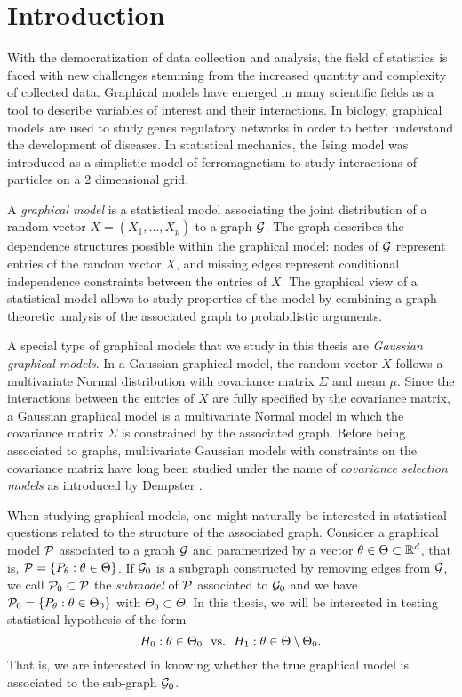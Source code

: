 \section{Introduction}

With the democratization of data collection and analysis, the field of statistics is faced with new challenges stemming from the increased quantity and complexity of collected data. Graphical models have emerged in many scientific fields as a tool to describe variables of interest and their interactions. In biology, graphical models are used to study genes regulatory networks in order to better understand the development of diseases. In statistical mechanics, the Ising model \cite{ising1925beitrag} was introduced as a simplistic model of ferromagnetism to study interactions of particles on a 2 dimensional grid.

A \textit{graphical model} is a statistical model associating the joint distribution of a random vector $X = (X_1, \ldots, X_p)$ to a graph ${\mathcal{G}}$. The graph describes the dependence structures possible within the graphical model: nodes of ${\mathcal{G}}$ represent entries of the random vector $X$, and missing edges represent conditional independence constraints between the entries of $X$. The graphical view of a statistical model allows to study properties of the model by combining a graph theoretic analysis of the associated graph to probabilistic arguments.

A special type of graphical models that we study in this thesis are \textit{Gaussian graphical models}. In a Gaussian graphical model, the random vector $X$ follows a multivariate Normal distribution with covariance matrix $\Sigma$ and mean $\mu$. Since the interactions between the entries of $X$ are fully specified by the covariance matrix, a Gaussian graphical model is a multivariate Normal model in which the covariance matrix $\Sigma$ is constrained by the associated graph. Before being associated to graphs, multivariate Gaussian models with constraints on the covariance matrix have long been studied under the name of \textit{covariance selection models} as introduced by Dempster \cite{10.2307/2528966}.

When studying graphical models, one might naturally be interested in statistical questions related to the structure of the associated graph. Consider a graphical model ${\mathcal{P}}$ associated to a graph ${\mathcal{G}}$ and parametrized by a vector $\theta \in \Theta \subset \mathbb{R}^d$, that is, ${\mathcal{P}} = {\left\{ P_\theta : \theta \in \Theta \right\}}$. If ${\mathcal{G}}_0$ is a subgraph constructed by removing edges from ${\mathcal{G}}$, we call ${\mathcal{P}}_0 \subset {\mathcal{P}}$ the \textit{submodel} of ${\mathcal{P}}$ associated to ${\mathcal{G}}_0$ and we have ${\mathcal{P}}_0 = {\left\{ P_\theta : \theta \in \Theta_0 \right\}}$ with $\Theta_0 \subset \Theta$. In this thesis, we will be interested in testing statistical hypothesis of the form
\begin{equation*}
    H_0 : \theta \in \Theta_0 \ \ \t{vs.} \ \ H_1 : \theta \in \Theta \setminus \Theta_0.
\end{equation*}
That is, we are interested in knowing whether the true graphical model is associated to the sub-graph ${\mathcal{G}}_0$.

